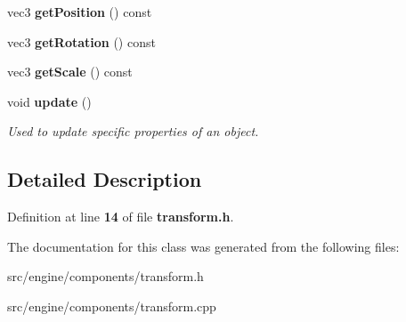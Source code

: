 \begin{DoxyCompactItemize}
\item 
\mbox{\label{class_components_1_1_transform_a40dbb9e1073a70e6e6afaf18b96f3560}} 
vec3 {\bfseries get\+Position} () const
\item 
\mbox{\label{class_components_1_1_transform_adc473e8a65708661825a37995259a90c}} 
vec3 {\bfseries get\+Rotation} () const
\item 
\mbox{\label{class_components_1_1_transform_a18b2efaf170dfab5367f8abd7d79ba69}} 
vec3 {\bfseries get\+Scale} () const
\item 
\mbox{\label{class_components_1_1_transform_a377194ad810fc2e6d05e3008eb8c7655}} 
void \textbf{ update} ()
\begin{DoxyCompactList}\small\item\em Used to update specific properties of an object. \end{DoxyCompactList}\end{DoxyCompactItemize}


\subsection{Detailed Description}


Definition at line \textbf{ 14} of file \textbf{ transform.\+h}.



The documentation for this class was generated from the following files\+:\begin{DoxyCompactItemize}
\item 
src/engine/components/transform.\+h\item 
src/engine/components/transform.\+cpp\end{DoxyCompactItemize}
